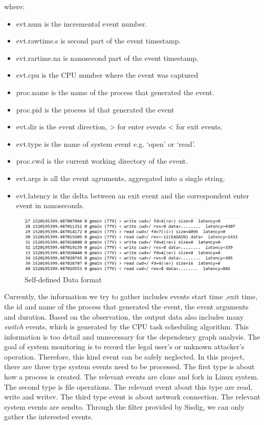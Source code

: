 where:
\begin{itemize}[noitemsep]
	\item evt.num is the incremental event number.
	\item evt.rawtime.s is second part of the event timestamp.
	\item evt.rartime.na is nanosecond part of the event timestamp.
	\item evt.cpu is the CPU number where the event was captured
	\item proc.name is the name of the process that generated the event.
	\item proc.pid is the process id that generated the event
	\item evt.dir is the event direction, > for enter events < for exit events.
	\item evt.type is the name of system event e.g. `open' or `read'.
	\item proc.cwd is the current working directory of the event.
	\item evt.args is all the event agruments, aggregated into a single string.
	\item evt.latency is the delta between an exit event and the correspondent enter event in nanoseconds.
\end{itemize}
\begin{figure}
	\centering
	\includegraphics[scale=0.4]{fig2}
	\caption{Self-defined Data format}
\end{figure}
Currently, the information we try to gather includes events start time ,exit time, the id and name of the process that generated the event, the event arguments and duration. Based on the observation, the output data also includes many \textit{switch} events, which is generated by the CPU task scheduling algorithm. This information is too detail and unnecessary for the dependency graph analysis. The goal of system monitoring is to record the legal user's or unknown attacker's operation. Therefore, this  kind event can be safely neglected. In this project, there are three type system events need to be processed. The first type is about how a process is created. The relevant events are clone and fork in Linux system. The second type is file operations. The relevant event about this type are read, write and writev. The third type event is about network connection. The relevant system events are sendto. Through the filter provided by Sisdig, we can only gather the interested events.
